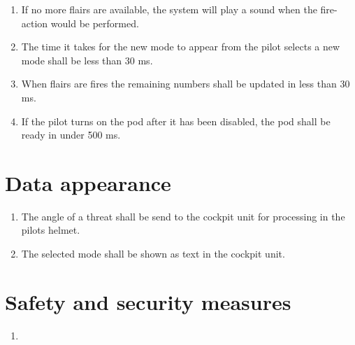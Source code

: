 \documentclass[Main]{subfiles}
\begin{document}
\begin{enumerate}[resume*]

\item If no more flairs are available, the system will play a sound when the fire-action would be performed.

\item The time it takes for the new mode to appear from the pilot selects a new mode shall be less than 30 ms.

\item When flairs are fires the remaining numbers shall be updated in less than 30 ms.

\item If the pilot turns on the pod after it has been disabled, the pod shall be ready in under 500 ms.

\end{enumerate}

\section{Data appearance}

\begin{enumerate}[resume*]

\item The angle of a threat shall be send to the cockpit unit for processing in the pilots helmet.

\item The selected mode shall be shown as text in the cockpit unit.

\end{enumerate}

\section{Safety and security measures}

\begin{enumerate}[resume*]

\item 

\end{enumerate}
\end{document}
